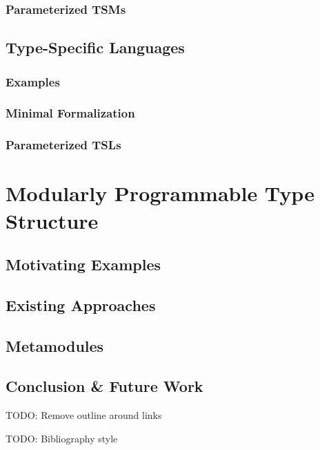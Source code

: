 \documentclass[12pt]{cmuthesis}
\newcommand{\todo}[1]{{\color{red} TODO: #1}}
\begin{document}
\section{Parameterized TSMs}
\chapter{Type-Specific Languages}
\section{Examples}
\section{Minimal Formalization}
\section{Parameterized TSLs}

\part{Modularly Programmable Type Structure}
\chapter{Motivating Examples}

\chapter{Existing Approaches}

\chapter{Metamodules}

\chapter{Conclusion \& Future Work}

\appendix
%

\backmatter

\todo{Remove outline around links}

\todo{Bibliography style}
\renewcommand{\bibsection}{\chapter{\bibname}}

\end{document}
